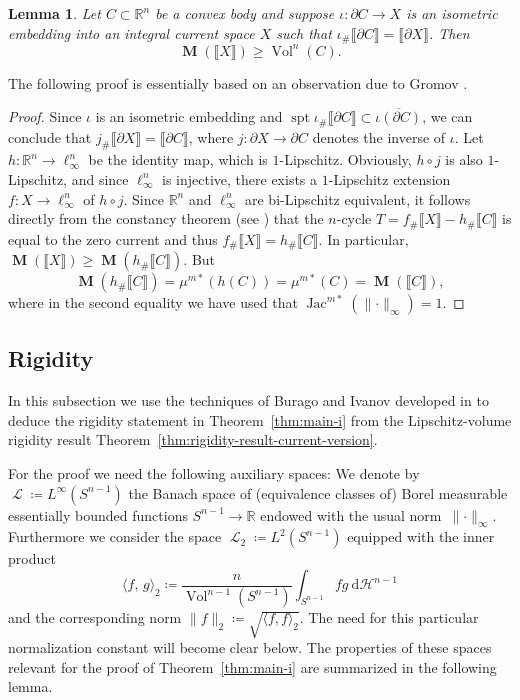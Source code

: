 \documentclass[reqno]{amsart}
\newtheorem{lemma}[theorem]{Lemma}
\numberwithin{equation}{section}
\newcommand{\R}{\mathbb{R}}
\newcommand{\Ha}{\mathcal{H}}
\newcommand{\spt}{\operatorname{spt}}
\newcommand{\ud}{\mathrm {d}}
\newcommand{\vol}{\operatorname{Vol}}
\newcommand{\Jac}{\operatorname{Jac}}
\newcommand{\norm}[1]{\lVert#1\rVert}
\newcommand{\bb}[1]{\llbracket #1\rrbracket}
\newcommand{\susbet}{\subset}
\DeclareMathOperator{\mass}{\mathbf{M}}
\DeclareMathOperator{\Ell}{\mathscr{L}}
\begin{document}
\begin{lemma}\label{lem:absolute-filling-vol}
Let \(C\susbet \R^n\) be a convex body and suppose \(\iota\colon\partial C \to X\) is an isometric embedding into an integral current space \(X\) such that \(\iota_\# \bb{\partial C}=\bb{\partial X}\). Then
\[
\mass(\bb{X})\geq \vol^n(C).
\]
\end{lemma}
The following proof is essentially based on an observation due to Gromov \cite[Proposition~2.1.A]{gromov-1983}.
\begin{proof}
Since \(\iota\) is an isometric embedding and \(\spt \iota_\# \bb{\partial C} \susbet \overline{\iota(\partial C)}\), we can conclude that \(j_\# \bb{\partial X}=\bb{\partial C}\), where \(j\colon \partial X \to \partial C\) denotes the inverse of \(\iota\). Let \(h\colon \R^n \to \ell_\infty^n\) be the identity map, which is \(1\)-Lipschitz. Obviously, \(h\circ j\) is also \(1\)-Lipschitz, and since \(\ell_\infty^n\) is injective, there exists a \(1\)-Lipschitz extension \(f\colon X\to \ell_\infty^n\) of \(h \circ j\). Since \(\R^n\) and \(\ell_\infty^n\) are bi-Lipschitz equivalent, it follows directly from the constancy theorem (see \cite[Corollary 3.13]{fed60}) that the \(n\)-cycle \(T=f_\# \bb{X}-h_\# \bb{C}\) is equal to the zero current and thus \(f_\# \bb{X}=h_\# \bb{C}\). In particular, \(\mass(\bb{X}) \geq \mass(h_\# \bb{C})\). But 
\[
\mass(h_\# \bb{C})=\mu^{m\ast}(h(C))=\mu^{m\ast}(C)=\mass(\bb{C}),
\]
where in the second equality we have used that \(\Jac^{m\ast}(\norm{\cdot}_\infty)=1\). 
\end{proof}
\subsection{Rigidity}\label{sec:6.2}

In this subsection we use the techniques of Burago and Ivanov developed in \cite{bi10, bi13} to deduce the rigidity statement in Theorem~\ref{thm:main-i} from the Lipschitz-volume rigidity result Theorem~\ref{thm:rigidity-result-current-version}.

For the proof we need the following auxiliary spaces: We denote by $\Ell\coloneqq L^\infty(S^{n-1})$ the Banach space of (equivalence classes of) Borel measurable essentially bounded functions $S^{n-1}\to \R$ endowed with the usual norm~$\norm{\cdot}_\infty$. Furthermore we consider the space $\Ell_2\coloneqq L^2(S^{n-1})$ equipped with the inner product
\[
\langle f, \, g\rangle_{2} \coloneqq \frac{n}{\vol^{n-1}(S^{n-1})}\int_{S^{n-1}}fg\ \ud\Ha^{n-1}
\]
and the corresponding norm $\|f\|_2\coloneqq \sqrt{\langle f,f\rangle_{2}}$. The need for this particular normalization constant will become clear below. The properties of these spaces relevant for the proof of Theorem~\ref{thm:main-i} are summarized in the following lemma.
\end{document}
